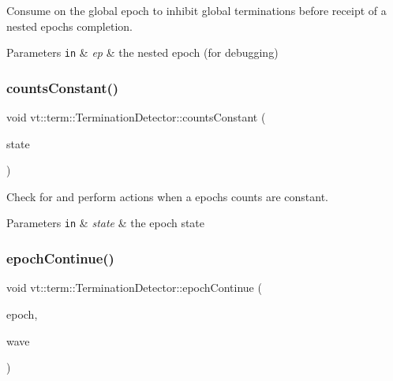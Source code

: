 Consume on the global epoch to inhibit global terminations before receipt of a nested epoch\textquotesingle{}s completion. 


\begin{DoxyParams}[1]{Parameters}
\mbox{\tt in}  & {\em ep} & the nested epoch (for debugging) \\
\hline
\end{DoxyParams}
\mbox{\label{structvt_1_1term_1_1_termination_detector_a9460b5236e34a5baa344b0ac814ce3c9}} 
\subsubsection{\texorpdfstring{counts\+Constant()}{countsConstant()}}
{\footnotesize\ttfamily void vt\+::term\+::\+Termination\+Detector\+::counts\+Constant (\begin{DoxyParamCaption}\item[{\hyperlink{structvt_1_1term_1_1_term_action_ae4c635b69751d887666814700ed64d65}{Term\+State\+Type} \&}]{state }\end{DoxyParamCaption})\hspace{0.3cm}{\ttfamily [private]}}



Check for and perform actions when a epoch\textquotesingle{}s counts are constant. 


\begin{DoxyParams}[1]{Parameters}
\mbox{\tt in}  & {\em state} & the epoch state \\
\hline
\end{DoxyParams}
\mbox{\label{structvt_1_1term_1_1_termination_detector_aa26ade7d870d21b3ec9f5e97154bb847}} 
\subsubsection{\texorpdfstring{epoch\+Continue()}{epochContinue()}}
{\footnotesize\ttfamily void vt\+::term\+::\+Termination\+Detector\+::epoch\+Continue (\begin{DoxyParamCaption}\item[{\hyperlink{namespacevt_a985a5adf291c34a3ca263b3378388236}{Epoch\+Type} const \&}]{epoch,  }\item[{\hyperlink{namespacevt_1_1term_a4af17606966b2b5a6cba523bc39095a3}{Term\+Wave\+Type} const \&}]{wave }\end{DoxyParamCaption})\hspace{0.3cm}{\ttfamily [private]}}



